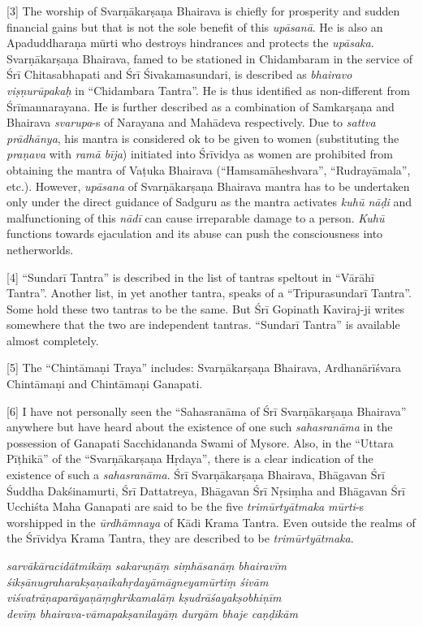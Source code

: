 \documentclass[12pt,oneside,a4paper]{article}
\newenvironment{shloka}[1]
  {\bigskip\center#1\varwidth{\linewidth}}
  {\endvarwidth\endcenter\bigskip}
\newcommand{\tl}[1]{\emph{#1}}
\begin{document}
[3] The worship of Svarṇākarṣaṇa Bhairava is chiefly for prosperity and sudden
financial gains but that is not the sole benefit of this \tl{upāsanā}. He is
also an Apaduddharaṇa mūrti who destroys hindrances and protects the \tl{upāsaka}.
Svarṇākarṣaṇa Bhairava, famed to be stationed in Chidambaram in the service
of Śrī Chitasabhapati and Śrī Śivakamasundari, is described as \tl{bhairavo
viṣṇurūpakaḥ} in ``Chidambara Tantra''. He is thus identified as non-different
from Śrīmannarayana. He is further described as a combination of Samkarṣaṇa
and Bhairava \tl{svarupa}-s of Narayana and Mahādeva respectively. Due to
\tl{sattva prādhānya}, his mantra is considered ok to be given to women
(substituting the \tl{praṇava} with \tl{ramā bīja}) initiated into Śrīvidya
as women are prohibited from obtaining the mantra of Vaṭuka Bhairava
(``Hamsamāheshvara'', ``Rudrayāmala'', etc.). However, \tl{upāsana} of
Svarṇākarṣaṇa Bhairava mantra has to be undertaken only under the direct
guidance of Sadguru as the mantra activates \tl{kuhū nāḍi} and malfunctioning
of this \tl{nādī} can cause irreparable damage to a person. \tl{Kuhū} functions
towards ejaculation and its abuse can push the consciousness into netherworlds.

[4] ``Sundarī Tantra'' is described in the list of tantras speltout in ``Vārāhī
Tantra''. Another list, in yet another tantra, speaks of a ``Tripurasundarī
Tantra''. Some hold these two tantras to be the same. But Śrī Gopinath
Kaviraj-ji writes somewhere that the two are independent tantras. ``Sundarī
Tantra'' is available almost completely.

[5] The ``Chintāmaṇi Traya'' includes: Svarṇākarṣaṇa Bhairava, Ardhanārīśvara
Chintāmaṇi and Chintāmaṇi Ganapati.

[6] I have not personally seen the ``Sahasranāma of Śrī Svarṇākarṣaṇa Bhairava''
anywhere but have heard about the existence of one such \tl{sahasranāma} in
the possession of Ganapati Sacchidananda Swami of Mysore. Also, in the ``Uttara
Pīṭhikā'' of the ``Svarṇākarṣaṇa Hṛdaya'', there is a clear indication of
the existence of such a \tl{sahasranāma}. Śrī Svarṇākarṣaṇa Bhairava, Bhāgavan
Śrī Śuddha Dakśinamurti, Śrī Dattatreya, Bhāgavan Śrī Nṛsiṃha and Bhāgavan
Śrī Ucchiśta Maha Ganapati are said to be the five \tl{trimūrtyātmaka mūrti}-s
worshipped in the \tl{ūrdhāmnaya} of Kādi Krama Tantra. Even outside the realms
of the Śrīvidya Krama Tantra, they are described to be \tl{trimūrtyātmaka}.

\begin{shloka}\itshape
  sarvākāracidātmikāṃ sakaruṇāṃ siṃhāsanāṃ bhairavīm \\
  śikṣānugraharakṣaṇaikahṛdayāmāgneyamūrtiṃ śivām \\
  viśvatrāṇaparāyaṇāṃghrikamalāṃ kṣudrāśayakṣobhiṇīm \\
  devīṃ bhairava-vāmapakṣanilayāṃ durgām bhaje caṇḍikām
\end{shloka}
\end{document}
